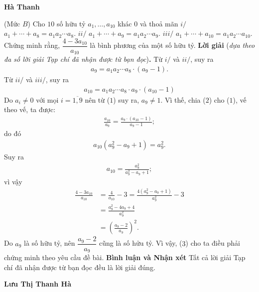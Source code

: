 \begin{multicols}{2}
\begin{flushright}
		\textbf{\color{thachthuctoanhoc}Hà Thanh}
	\end{flushright}
	{}
	(Mức $B$) Cho $10$ số hữu tỷ $a_1,\ldots,a_{10}$ khác $0$ và thoả mãn
	\vskip 0.05cm
	$i/$ $a_1+\cdots+a_8=a_1a_2\cdots a_8$. 
	\vskip 0.05cm
	$ii/$ $a_1+\cdots+a_9=a_1a_2\cdots a_9$. 
	\vskip 0.05cm
	$iii/$ $a_1+\cdots+a_{10}=a_1a_2\cdots a_{10}$. 
	\vskip 0.05cm
	Chứng minh rằng, $\dfrac{4-3a_{10}}{a_{10}}$ là bình phương của một số hữu tỷ.
	\vskip 0.05cm
	\textbf{\color{thachthuctoanhoc}Lời giải} (\textit{dựa theo đa số lời giải Tạp chí đã nhận được từ bạn đọc})\textbf{\color{thachthuctoanhoc}.}
	\vskip 0.05cm
	Từ $i/$ và $ii/$, suy ra
	\begin{align*}
		{a_9} = {a_1}{a_2} \cdots {a_8} \cdot \left( {{a_9} - 1} \right). \tag{$1$}
	\end{align*}
	Từ $ii/$ và $iii/$, suy ra
	\begin{align*}
		{a_{10}} = {a_1}{a_2} \cdots {a_8} \cdot {a_9} \cdot \left( {{a_{10}} - 1} \right)
	\end{align*}
	Do $a_i \ne 0$ với mọi $i = \overline{1,9}$  nên từ ($1$) suy ra, $a_9 \ne 1$.  Vì thế, chia ($2$) cho ($1$), vế theo vế, ta được:
	\begin{align*}
		\frac{{{a_{10}}}}{{{a_9}}} = \frac{{{a_9} \cdot \left( {{a_{10}} - 1} \right)}}{{{a_9} - 1}};
	\end{align*}
	do đó
	\begin{align*}
		{a_{10}}\left( {a_9^2 - {a_9} + 1} \right) = a_9^2.
	\end{align*}
	Suy ra
	\begin{align*}
		{a_{10}} = \frac{{a_9^2}}{{a_9^2 - {a_9} + 1}};
	\end{align*}
	vì vậy
	\begin{align*}
		\frac{{4 - 3{a_{10}}}}{{{a_{10}}}} &= \frac{4}{{{a_{10}}}} - 3 = \frac{{4\left( {a_9^2 - {a_9} + 1} \right)}}{{a_9^2}} - 3 \\
		&= \frac{{a_9^2 - 4{a_9} + 4}}{{a_9^2}} \\
		&= {\left( {\frac{{{a_9} - 2}}{{{a_9}}}} \right)^2}.
	\end{align*}
	Do $a_9$ là số hữu tỷ, nên $\dfrac{a_9 - 2}{a_9}$ cũng là số hửu tỷ. Vì vậy, ($3$) cho ta điều phải chứng minh theo yêu cầu đề bài.
	\vskip 0.05cm
	\textbf{\color{thachthuctoanhoc}Bình luận và Nhận xét}
	\vskip 0.05cm
	Tất cả lời giải Tạp chí đã nhận được từ bạn đọc đều là lời giải đúng.
	\begin{flushright}
		\textbf{\color{thachthuctoanhoc}Lưu Thị Thanh Hà}

\end{flushright}
\end{multicols}
